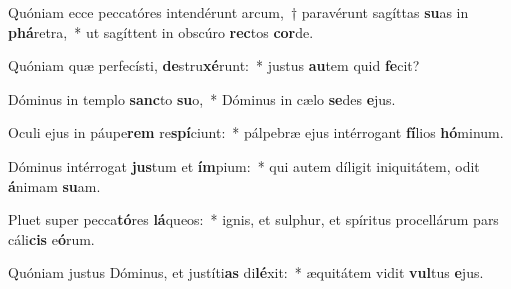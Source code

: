 \item Quóniam ecce peccatóres intendérunt arcum,~† paravérunt sagíttas \textbf{su}as in \textbf{phá}retra,~* ut sagíttent in obscúro \textbf{rec}tos \textbf{cor}de.
\item Quóniam quæ perfecísti, \textbf{de}stru\textbf{xé}runt:~* justus \textbf{au}tem quid \textbf{fe}cit?
\item Dóminus in templo \textbf{sanc}to \textbf{su}o,~* Dóminus in cælo \textbf{se}des \textbf{e}jus.
\item Oculi ejus in páupe\textbf{rem} re\textbf{spí}ciunt:~* pálpebræ ejus intérrogant \textbf{fí}lios \textbf{hó}minum.
\item Dóminus intérrogat \textbf{jus}tum et \textbf{ím}pium:~* qui autem díligit iniquitátem, odit \textbf{á}nimam \textbf{su}am.
\item Pluet super pecca\textbf{tó}res \textbf{lá}queos:~* ignis, et sulphur, et spíritus procellárum pars cáli\textbf{cis} e\textbf{ó}rum.
\item Quóniam justus Dóminus, et justíti\textbf{as} di\textbf{lé}xit:~* æquitátem vidit \textbf{vul}tus \textbf{e}jus.
